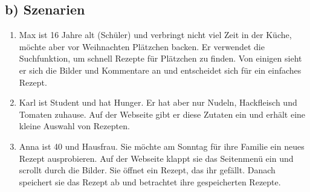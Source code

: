 \documentclass[parskip,10pt,abstracton]{scrartcl}
\begin{document}
% 
% 

\pagebreak
\subsection*{b) Szenarien}

\begin{enumerate}[(1)]
 \item Max ist 16 Jahre alt (Schüler) und verbringt nicht viel Zeit in der Küche, möchte aber vor Weihnachten Plätzchen backen. Er verwendet die Suchfunktion, um schnell Rezepte für Plätzchen zu finden. Von einigen sieht er sich die Bilder und Kommentare an und entscheidet sich für ein einfaches Rezept.
 
 
 \item Karl ist Student und hat Hunger. Er hat aber nur Nudeln, Hackfleisch und Tomaten zuhause. Auf der Webseite gibt er diese Zutaten ein und erhält eine kleine Auswahl von Rezepten. 
 
 
 \item Anna ist 40 und Hausfrau. Sie möchte am Sonntag für ihre Familie ein neues Rezept ausprobieren. Auf der Webseite klappt sie das Seitenmenü ein und scrollt durch die Bilder. Sie öffnet ein Rezept, das ihr gefällt. Danach speichert sie das Rezept ab und betrachtet ihre gespeicherten Rezepte. 
 
\end{enumerate}
\end{document}
